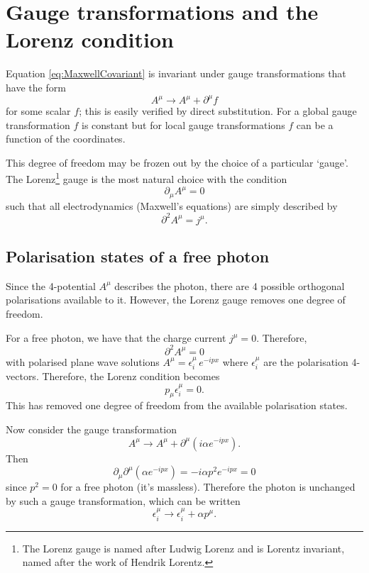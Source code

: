 \documentclass{report}
\begin{document}
\section{Gauge transformations and the Lorenz condition}
Equation \eqref{eq:MaxwellCovariant} is invariant under gauge transformations that have the form
\begin{equation}
A^\mu \rightarrow A^\mu + \partial^\mu f
\end{equation}
for some scalar $f$; this is easily verified by direct substitution. For a global gauge transformation $f$ is constant but for local gauge transformations $f$ can be a function of the coordinates.

This degree of freedom may be frozen out by the choice of a particular `gauge'. The Lorenz\footnote{The Lorenz gauge is named after Ludwig Lorenz and is Lorentz invariant, named after the work of Hendrik Lorentz.} gauge is the most natural choice with the condition
\begin{equation}
\partial_\mu A^\mu = 0 \label{eq:LorentzGauge}
\end{equation}
such that all electrodynamics (Maxwell's equations) are simply described by
\begin{equation}\boxed{
\partial^2 A^\mu = j^\mu.
}\end{equation}

\subsection{Polarisation states of a free photon}
Since the 4-potential $A^\mu$ describes the photon, there are 4 possible orthogonal polarisations available to it. However, the Lorenz gauge removes one degree of freedom.

For a free photon, we have that the charge current $j^\mu = 0$. Therefore,
\begin{equation}
\partial^2 A^\mu = 0
\end{equation}
with polarised plane wave solutions $A^\mu = \epsilon^\mu_i \, e^{-ipx}$ where $\epsilon^\mu_i$ are the polarisation 4-vectors. Therefore, the Lorenz condition becomes
\begin{equation}
p_\mu \epsilon^\mu_i = 0.
\end{equation}
This has removed one degree of freedom from the available polarisation states.

Now consider the gauge transformation
\begin{equation}
A^\mu \rightarrow A^\mu + \partial^\mu\left( i\alpha e^{-ipx} \right).
\end{equation}
Then
\begin{equation}
\partial_\mu \partial^\mu \left( \alpha e^{-ipx} \right) = -i \alpha p^2 e^{-ipx} = 0
\end{equation}
since $p^2 = 0$ for a free photon (it's massless). Therefore the photon is unchanged by such a gauge transformation, which can be written
\begin{equation}
\epsilon_i^\mu \rightarrow \epsilon_i^\mu + \alpha p^\mu.
\end{equation}
\end{document}
